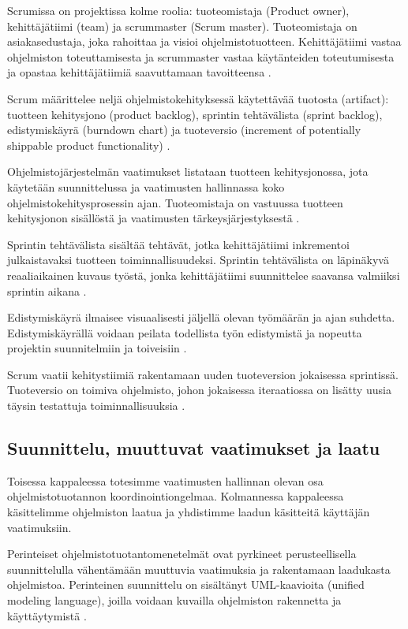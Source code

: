 \documentclass[finnish]{tktltiki2}
\theoremstyle{definition}
\theoremstyle{remark}
\begin{document}
Scrumissa on projektissa kolme roolia: tuoteomistaja (Product owner), kehittäjätiimi (team) ja scrummaster (Scrum master). Tuoteomistaja on asiakasedustaja, joka rahoittaa ja visioi ohjelmistotuotteen. Kehittäjätiimi vastaa ohjelmiston toteuttamisesta ja scrummaster vastaa käytänteiden toteutumisesta ja opastaa kehittäjätiimiä saavuttamaan tavoitteensa \cite{SCH09}.

Scrum määrittelee neljä ohjelmistokehityksessä käytettävää tuotosta (artifact): tuotteen kehitysjono (product backlog), sprintin tehtävälista (sprint backlog), edistymiskäyrä (burndown chart) ja tuoteversio (increment of potentially shippable product functionality) \cite{SCH09}. 

Ohjelmistojärjestelmän vaatimukset listataan tuotteen kehitysjonossa, jota käytetään suunnittelussa ja vaatimusten hallinnassa koko ohjelmistokehitysprosessin ajan. Tuoteomistaja on vastuussa tuotteen kehitysjonon sisällöstä ja vaatimusten tärkeysjärjestyksestä \cite{SCH09}.

Sprintin tehtävälista sisältää tehtävät, jotka kehittäjätiimi inkrementoi julkaistavaksi tuotteen toiminnallisuudeksi. Sprintin tehtävälista on läpinäkyvä reaaliaikainen kuvaus työstä, jonka kehittäjätiimi suunnittelee saavansa valmiiksi sprintin aikana \cite{SCH09}.

Edistymiskäyrä ilmaisee visuaalisesti jäljellä olevan työmäärän ja ajan suhdetta. Edistymiskäyrällä voidaan peilata todellista työn edistymistä ja nopeutta projektin suunnitelmiin ja toiveisiin \cite{SCH09}.

Scrum vaatii kehitystiimiä rakentamaan uuden tuoteversion jokaisessa sprintissä. Tuoteversio on toimiva ohjelmisto, johon jokaisessa iteraatiossa on lisätty uusia täysin testattuja toiminnallisuuksia \cite{SCH09}.

\subsection{Suunnittelu, muuttuvat vaatimukset ja laatu}

Toisessa kappaleessa totesimme vaatimusten hallinnan olevan osa ohjelmistotuotannon koordinointiongelmaa. Kolmannessa kappaleessa käsittelimme ohjelmiston laatua ja yhdistimme laadun käsitteitä käyttäjän vaatimuksiin. 

Perinteiset ohjelmistotuotantomenetelmät ovat pyrkineet perusteellisella suunnittelulla vähentämään muuttuvia vaatimuksia ja rakentamaan laadukasta ohjelmistoa. Perinteinen suunnittelu on sisältänyt UML-kaavioita (unified modeling language), joilla voidaan kuvailla ohjelmiston rakennetta ja käyttäytymistä \cite{FOW01b}.
 
\end{document}
